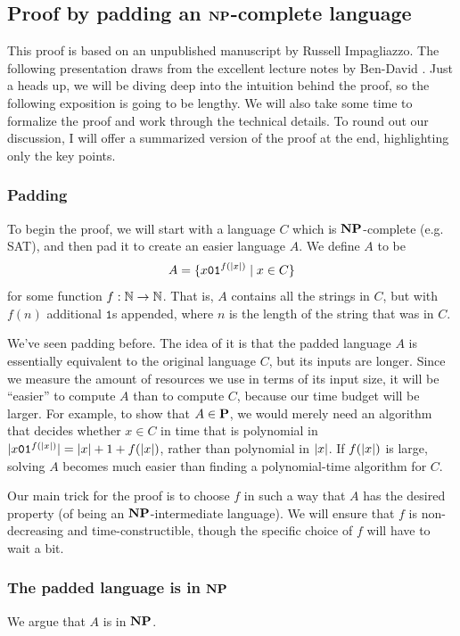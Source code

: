 \subsection{Proof by padding an $\textbf{NP}$-complete language}
This proof is based on an unpublished manuscript by Russell Impagliazzo. The following presentation draws from the excellent lecture notes by Ben-David \cite{ben2021np}. Just a heads up, we will be diving deep into the intuition behind the proof, so the following exposition is going to be lengthy. We will also take some time to formalize the proof and work through the technical details. To round out our discussion, I will offer a summarized version of the proof at the end, highlighting only the key points.

\subsubsection{Padding}
To begin the proof, we will start with a language $C$ which is $\textbf{NP}$-complete (e.g. SAT), and then pad it to create an easier language $A$. We define $A$ to be
\[ A = \{ x\texttt{0}\texttt{1}^{f(| x |)} \mid x \in C \} \]
for some function $f : \mathbb N \to \mathbb N$. That is, $A$ contains all the strings in $C$, but with $f(n)$ additional $\texttt{1}$s appended, where $n$ is the length of the string that was in $C$.

We've seen padding before. The idea of it is that the padded language $A$ is essentially equivalent to the original language $C$, but its inputs are longer. Since we measure the amount of resources we use in terms of its input size, it will be ``easier'' to compute $A$ than to compute $C$, because our time budget will be larger. For example, to show that $A \in \textbf{P}$, we would merely need an algorithm that decides whether $x \in C$ in time that is polynomial in $| x\texttt{0}\texttt{1}^{f(| x |)} | = | x | + 1 + f(| x |)$, rather than polynomial in $| x |$. If $f(| x |)$ is large, solving $A$ becomes much easier than finding a polynomial-time algorithm for $C$.

Our main trick for the proof is to choose $f$ in such a way that $A$ has the desired property (of being an $\textbf{NP}$-intermediate language). We will ensure that $f$ is non-decreasing and time-constructible, though the specific choice of $f$ will have to wait a bit.

\subsubsection{The padded language is in $\textbf{NP}$}
We argue that $A$ is in $\textbf{NP}$.

